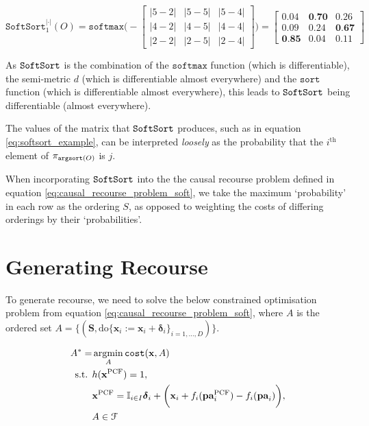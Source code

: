 \begin{equation} \label{eq:softsort_example}
	\texttt{SoftSort}^{|\cdot|}_{1}(O) = 
	\texttt{softmax} \Bigg(-\begin{bmatrix}
		|5-2| & |5-5| & |5-4| \\
		|4-2| & |4-5| & |4-4| \\
		|2-2| & |2-5| & |2-4|
	\end{bmatrix} \Bigg)	
	=
	\begin{bmatrix}
		0.04 & \textbf{0.70} & 0.26 \\
		0.09 & 0.24 & \textbf{0.67} \\
		\textbf{0.85} & 0.04 & 0.11
	\end{bmatrix}
\end{equation}

As $\operatorname*{\texttt{SoftSort}}$ is the combination of the $\texttt{softmax}$ function (which is differentiable), the semi-metric $d$ (which is differentiable almost everywhere) and the $\texttt{sort}$ function (which is differentiable almost everywhere), this leads to $\operatorname*{\texttt{SoftSort}}$ being differentiable (almost everywhere).

The values of the matrix that $\operatorname*{\texttt{SoftSort}}$ produces, such as in equation \ref{eq:softsort_example}, can be interpreted \textit{loosely} as the probability that the $i^{\text{th}}$ element of $\pi_{\operatorname*{\texttt{argsort}}(O)}$ is $j$.

When incorporating $\operatorname*{\texttt{SoftSort}}$ into the the causal recourse problem defined in equation \ref{eq:causal_recourse_problem_soft}, we take the maximum `probability' in each row as the ordering $S$, as opposed to weighting the costs of differing orderings by their `probabilities'.

\section{Generating Recourse} \label{section:generating_recourse}

To generate recourse, we need to solve the below constrained optimisation problem from equation \ref{eq:causal_recourse_problem_soft}, where $A$ is the ordered set $A = \big\{(\mathbf{S}, \text{do} \{\mathbf{x}_i:=\mathbf{x}_i + \boldsymbol{\delta}_i\}_{i=1, \ldots, D})\big\}$.

\begin{align}
	A^* = & \operatorname*{argmin}_{A} \texttt{cost}(\mathbf{x}, A) \\ \nonumber
	\text{s.t. } & h(\mathbf{x}^{\text{PCF}}) = 1, \\ \nonumber
	& 	\mathbf{x}^{\text{PCF}} = \mathbb{I}_{i \in I} \boldsymbol{\delta}_i + \bigg( \mathbf{x}_i + f_i(\textbf{pa}^{\text{PCF}}_i) - f_i(\textbf{pa}_i) \bigg), \\ \nonumber
	& A \in \mathcal{F}
\end{align} 

